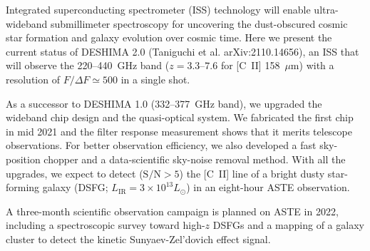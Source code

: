 \documentclass[ja]{2022a}
\begin{document}
Integrated superconducting spectrometer (ISS) technology will enable ultra-wideband submillimeter spectroscopy for uncovering the dust-obscured cosmic star formation and galaxy evolution over cosmic time.
Here we present the current status of DESHIMA 2.0 (Taniguchi et al. arXiv:2110.14656), an ISS that will observe the 220--440~GHz band ($z=3.3\textrm{--}7.6$ for [C~II] 158~$\mu$m) with a resolution of $F / \Delta F \simeq 500$ in a single shot.

As a successor to DESHIMA 1.0 (332--377~GHz band), we upgraded the wideband chip design and the quasi-optical system.
We fabricated the first chip in mid 2021 and the filter response measurement shows that it merits telescope observations.
For better observation efficiency, we also developed a fast sky-position chopper and a data-scientific sky-noise removal method.
With all the upgrades, we expect to detect ($\textrm{S/N}>5$) the [C~II] line of a bright dusty star-forming galaxy (DSFG; $L_{\mathrm{IR}} = 3 \times 10^{13} L_{\odot}$) in an eight-hour ASTE observation.

A three-month scientific observation campaign is planned on ASTE in 2022, including a spectroscopic survey toward high-$z$ DSFGs and a mapping of a galaxy cluster to detect the kinetic Sunyaev-Zel'dovich effect signal.
\end{document}
